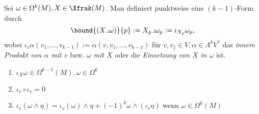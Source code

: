 \begin{defn*}
	Sei $ \omega \in \Omega^k(M), X \in \Xfrak(M) $. Man definiert punktweise eine $(k-1)$-Form durch
	\[ \bound{(X \lrcorner \omega)}{p} := X_p \lrcorner \omega_p := \iota_{X_p} \omega_p, \]
	wobei $ \iota_v \alpha (v_1, \dotsc,v_{k-1}) := \alpha(v,v_1,\dotsc,v_{k-1}) $ für $v,v_j \in V, \alpha \in \Lambda^kV^*$ das \emph{innere Produkt von $\alpha$ mit $v$} bzw. \emph{$\omega$ mit $X$} oder die \emph{Einsetzung von $X$ in $\omega$} ist.
\end{defn*}

\begin{rem}
	\begin{enumerate}[label={\roman*})]
		\item $ \iota_X \omega \in \Omega^{k-1}(M), \omega \in \Omega^k $
		\item $ \iota_v \circ \iota_v = 0 $
		\item $ \iota_v(\omega \wedge \eta) = \iota_v(\omega) \wedge \eta + (-1)^k \omega \wedge (\iota_v \eta) $ wenn $ \omega \in \Omega^k(M) $
	\end{enumerate}
\end{rem}